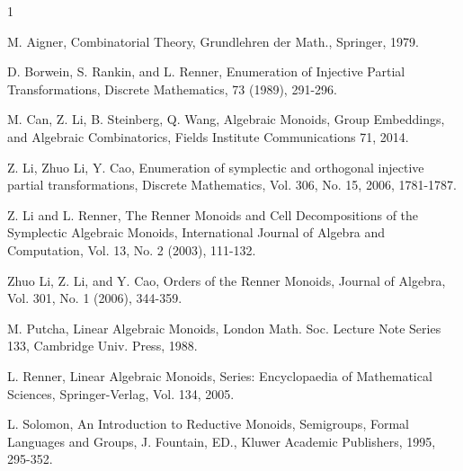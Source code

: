 \documentclass[11pt]{article}
\begin{document}
\begin{thebibliography}{1}

 M. Aigner, Combinatorial Theory, Grundlehren der Math., Springer, 1979.

 D. Borwein, S. Rankin, and L. Renner, Enumeration of Injective Partial
Transformations, Discrete Mathematics, 73 (1989), 291-296.

 M. Can, Z. Li, B. Steinberg, Q. Wang, Algebraic Monoids, Group Embeddings, and Algebraic Combinatorics, Fields Institute Communications 71, 2014.
    


 Z. Li, Zhuo Li, Y. Cao, Enumeration of symplectic and orthogonal injective partial transformations, Discrete Mathematics, Vol. 306, No. 15, 2006, 1781-1787.
    
 Z. Li and L. Renner, The Renner Monoids and Cell Decompositions of the Symplectic Algebraic Monoids,
International Journal of Algebra and Computation, Vol. 13, No. 2
(2003), 111-132.

 Zhuo Li, Z. Li, and Y. Cao, Orders of the Renner Monoids, Journal of Algebra, Vol. 301, No. 1 (2006), 344-359.

 M. Putcha, Linear Algebraic Monoids, London Math. Soc. Lecture Note Series 133, Cambridge Univ. Press, 1988.

 L. Renner, Linear Algebraic Monoids, Series: Encyclopaedia of Mathematical Sciences, Springer-Verlag, Vol. 134, 2005.

 L. Solomon, An Introduction to Reductive Monoids, Semigroups, Formal Languages and Groups, J. Fountain, ED., Kluwer Academic Publishers, 1995, 295-352.


\end{thebibliography}
\end{document}
